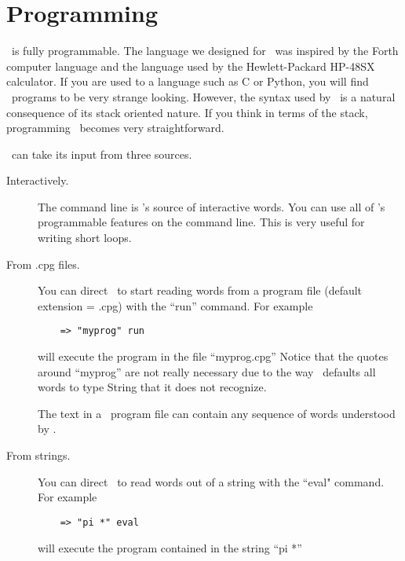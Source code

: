 
\chapter{Programming}


\CLAC\ is fully programmable. The language we designed for \CLAC\ was inspired by the Forth
computer language and the language used by the Hewlett-Packard HP-48SX calculator. If you are
used to a language such as C or Python, you will find \CLAC\ programs to be very strange
looking. However, the syntax used by \CLAC\ is a natural consequence of its stack oriented
nature. If you think in terms of the stack, programming \CLAC\ becomes very straightforward.

\CLAC\ can take its input from three sources.

\begin{description}
  
\item[Interactively.] The command line is \CLAC's source of interactive words. You can use all
  of \CLAC's programmable features on the command line. This is very useful for writing short
  loops.
  
\item[From .cpg files.] You can direct \CLAC\ to start reading words from a program file
  (default extension = .cpg) with the ``run'' command. For example

\begin{verbatim}
    => "myprog" run
\end{verbatim}
  
  will execute the program in the file ``myprog.cpg'' Notice that the quotes around ``myprog''
  are not really necessary due to the way \CLAC\ defaults all words to type String that it does
  not recognize.
  
  The text in a \CLAC\ program file can contain any sequence of words understood by \CLAC.
  
\item[From strings.] You can direct \CLAC\ to read words out of a string with the ``eval"
  command. For example

\begin{verbatim}
    => "pi *" eval
\end{verbatim}

will execute the program contained in the string ``pi *''

\end{description}


